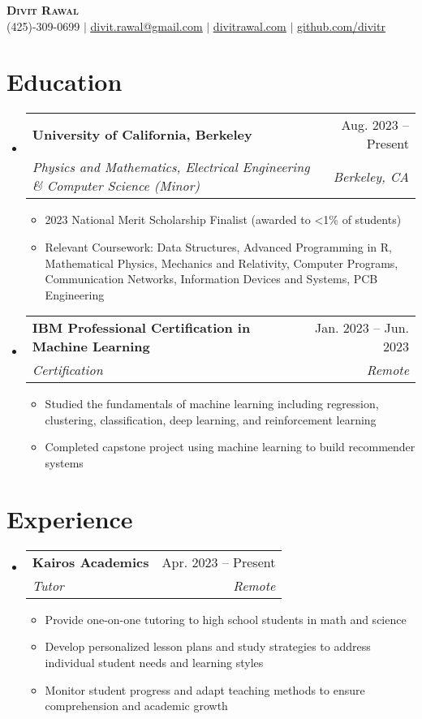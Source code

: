 \documentclass[letterpaper,11pt]{article}
\makeatletter
\newcommand{\resumeItem}[1]{
  \item\small{
    {#1 \vspace{-2pt}}
  }
}
\newcommand{\resumeSubheading}[4]{
  \vspace{-2pt}\item
    \begin{tabular*}{0.97\textwidth}[t]{l@{\extracolsep{\fill}}r}
      \textbf{#1} & #2 \\
      \textit{\small#3} & \textit{\small #4} \\
    \end{tabular*}\vspace{-7pt}
}
\newcommand{\resumeSubHeadingListStart}{\begin{itemize}[leftmargin=0.15in, label={}]}
\newcommand{\resumeSubHeadingListEnd}{\end{itemize}}
\newcommand{\resumeItemListStart}{\begin{itemize}}
\newcommand{\resumeItemListEnd}{\end{itemize}\vspace{-5pt}}
\makeatother
\begin{document}

\begin{center}
    \textbf{\Huge \scshape Divit Rawal} \\ \vspace{1pt}
    \small (425)-309-0699 $|$ \href{mailto:divit.rawal@gmail.com}{\underline{divit.rawal@gmail.com}} $|$ 
    \href{https://www.divitrawal.com}{\underline{divitrawal.com}} $|$
    \href{https://www.github.com/divitr/}{\underline{github.com/divitr}}
\end{center}

\section{Education}
  \resumeSubHeadingListStart
    \resumeSubheading
      {University of California, Berkeley}{Aug. 2023 -- Present}
      {Physics and Mathematics, Electrical Engineering \& Computer Science (Minor)}{Berkeley, CA}
      \resumeItemListStart
        \resumeItem{2023 National Merit Scholarship Finalist (awarded to \textless 1\% of students)}
        \resumeItem{Relevant Coursework: Data Structures, Advanced Programming in R, Mathematical Physics, Mechanics and Relativity, Computer Programs, Communication Networks,  Information Devices and Systems, PCB Engineering}
      \resumeItemListEnd
  \resumeSubHeadingListEnd

  \resumeSubHeadingListStart
    \resumeSubheading
      {IBM Professional Certification in Machine Learning}{Jan. 2023 -- Jun. 2023}
      {Certification}{Remote}
      \resumeItemListStart
        \resumeItem{Studied the fundamentals of machine learning including regression, clustering, classification, deep learning, and reinforcement learning}
        \resumeItem{Completed capstone project using machine learning to build recommender systems}
      \resumeItemListEnd
  \resumeSubHeadingListEnd

\section{Experience}
  \resumeSubHeadingListStart
    \resumeSubheading
      {Kairos Academics}{Apr. 2023 -- Present}
      {Tutor}{Remote}
      \resumeItemListStart
        \resumeItem{Provide one-on-one tutoring to high school students in math and science}
        \resumeItem{Develop personalized lesson plans and study strategies to address individual student needs and learning styles}
        \resumeItem{Monitor student progress and adapt teaching methods to ensure comprehension and academic growth}
      \resumeItemListEnd
  \resumeSubHeadingListEnd
\end{document}
